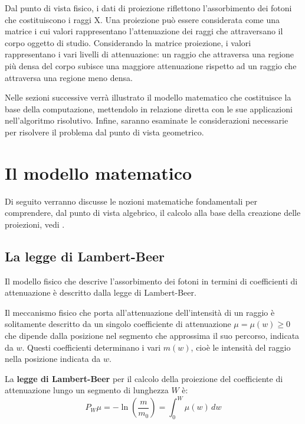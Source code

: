 \documentclass[12pt,a4paper]{report}
\begin{document}
Dal punto di vista fisico, i dati di proiezione riflettono l'assorbimento dei fotoni che costituiscono i raggi X.
Una proiezione può essere considerata come una matrice i cui valori rappresentano l'attenuazione dei raggi che attraversano il
corpo oggetto di studio.
Considerando la matrice proiezione, i valori rappresentano i vari livelli di attenuazione: un raggio che attraversa una regione
più densa del corpo subisce una maggiore attenuazione rispetto ad un raggio che attraversa una regione meno densa.

Nelle sezioni successive verrà illustrato il modello matematico che costituisce la base della computazione, mettendolo in
relazione diretta con le sue applicazioni nell'algoritmo risolutivo.
Infine, saranno esaminate le considerazioni necessarie per risolvere il problema dal punto di vista geometrico.

\section{Il modello matematico}

Di seguito verranno discusse le nozioni matematiche fondamentali per comprendere, dal punto di vista algebrico, il calcolo
alla base della creazione delle proiezioni, vedi \cite{MoroLoli2021}.

\subsection{La legge di Lambert-Beer}

Il modello fisico che descrive l'assorbimento dei fotoni in termini di coefficienti di attenuazione è descritto dalla legge di
Lambert-Beer.

Il meccanismo fisico che porta all'attenuazione dell'intensità di un raggio è solitamente descritto da un singolo coefficiente di
attenuazione \(\mu = \mu(w) \ge 0\) che dipende dalla posizione nel segmento che approssima il suo percorso, indicata da \(w\).
Questi coefficienti determinano i vari \(m(w)\), cioè le intensità del raggio nella posizione indicata da \(w\).

La \textbf{legge di Lambert-Beer} per il calcolo della proiezione del coefficiente di attenuazione lungo un segmento di lunghezza
\(W\) è:
\begin{equation} \label{eq:law_lambert-beer}
  P_W\mu = - \ln{(\frac{m}{m_0})} = \int_0^W \mu(w) \, dw
\end{equation}
\end{document}
